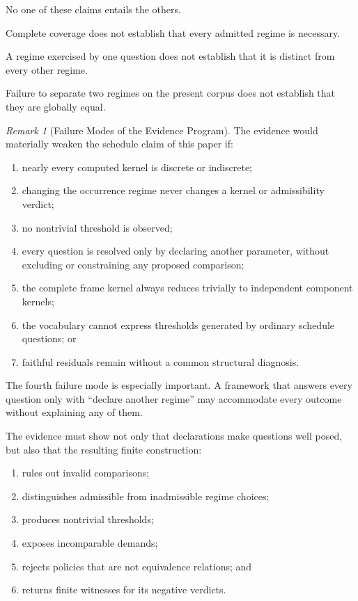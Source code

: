 \documentclass[11pt]{article}
\theoremstyle{plain}
\theoremstyle{definition}
\theoremstyle{remark}
\newtheorem{remark}[theorem]{Remark}
\begin{document}
No one of these claims entails the others.

Complete coverage does not establish
that every admitted regime is necessary.

A regime exercised by one question
does not establish that it is distinct
from every other regime.

Failure to separate two regimes
on the present corpus
does not establish that they are globally equal.

\begin{remark}[Failure Modes of the Evidence Program]
  \label{ik.rem.evidence-failure}
  The evidence would materially weaken
  the schedule claim of this paper if:
  \begin{enumerate}[label=(\alph*)]
    \item nearly every computed kernel
          is discrete or indiscrete;
    \item changing the occurrence regime
          never changes a kernel
          or admissibility verdict;
    \item no nontrivial threshold is observed;
    \item every question is resolved
          only by declaring another parameter,
          without excluding
          or constraining any proposed comparison;
    \item the complete frame kernel
          always reduces trivially
          to independent component kernels;
    \item the vocabulary cannot express
          thresholds generated
          by ordinary schedule questions; or
    \item faithful residuals remain
          without a common structural diagnosis.
  \end{enumerate}
\end{remark}

The fourth failure mode is especially important.
A framework that answers every question only with
``declare another regime''
may accommodate every outcome without explaining any of them.

The evidence must show
not only that declarations make questions well posed,
but also that the resulting finite construction:

\begin{enumerate}[label=(\alph*)]
  \item rules out invalid comparisons;
  \item distinguishes admissible from inadmissible regime choices;
  \item produces nontrivial thresholds;
  \item exposes incomparable demands;
  \item rejects policies that are not equivalence relations; and
  \item returns finite witnesses for its negative verdicts.
\end{enumerate}
\end{document}
